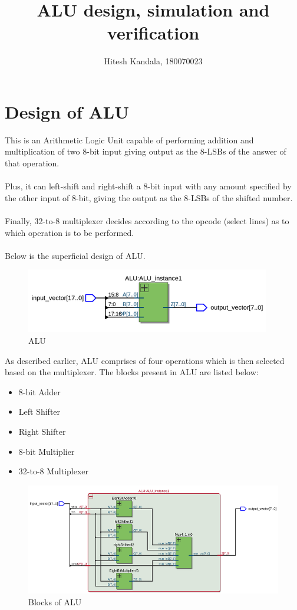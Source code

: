 \documentclass[12pt]{article}
\title{ALU design, simulation and verification}
\author{Hitesh Kandala, 180070023}
\begin{document}
\maketitle
\tableofcontents
\clearpage

\section{Design of ALU}
    This is an Arithmetic Logic Unit capable of performing addition and multiplication of two 8-bit input giving output as the 8-LSBs of the answer of that operation.\\\\
    Plus, it can left-shift and right-shift a 8-bit input with any amount specified by the other input of 8-bit, giving the output as the 8-LSBs of the shifted number.\\\\
    Finally, 32-to-8 multiplexer decides according to the opcode (select lines) as to which operation is to be performed.\\\\
    Below is the superficial design of ALU.\\
    \begin{figure}[H]
        \centering
        \includegraphics[width=0.6\linewidth]{alu.png}
        \caption{ALU}
        \label{fig:instru}
    \end{figure}
    \noindent
    As described earlier, ALU comprises of four operations which is then selected based on the multiplexer. The blocks present in ALU are listed below:
    \begin{itemize}
        \item 8-bit Adder
        \item Left Shifter
        \item Right Shifter
        \item 8-bit Multiplier
        \item 32-to-8 Multiplexer
    \end{itemize}
    \begin{figure}[H]
        \centering
        \includegraphics[width=0.6\linewidth]{alu_in.png}
        \caption{Blocks of ALU}
        \label{fig:instru}
    \end{figure}
\end{document}
